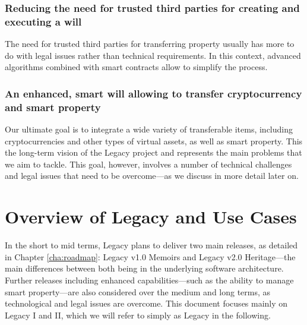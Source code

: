 \subsubsection*{Reducing the need for trusted third parties for creating and executing a will} %
\label{ssub:reducing_the_need_for_trusted_third_parties_for_creating_and_executing_a_will}
The need for trusted third parties for transferring property usually has more to do with legal issues rather than technical requirements. In this context, advanced algorithms combined with smart contracts allow to simplify the process.

\subsubsection*{An enhanced, smart will allowing to transfer cryptocurrency and smart property} %
\label{ssub:_an_enhanced_smart_will_allowing_to_transfer_cryptocurrency_and_smart_property_}
Our ultimate goal is to integrate a wide variety of transferable items, including cryptocurrencies and other types of virtual assets, as well as smart property. This the long-term vision of the Legacy project and represents the main problems that we aim to tackle. This goal, however, involves a number of technical challenges and legal issues that need to be overcome---as we discuss in more detail later on.


\section{Overview of Legacy and Use Cases} %
\label{sec:overview_of_legacy_and_use_cases}
In the short to mid terms, Legacy plans to deliver two main releases, as detailed in Chapter \ref{cha:roadmap}: Legacy v1.0 Memoirs and Legacy v2.0 Heritage---the main differences between both being in the underlying software architecture.  Further releases including enhanced capabilities---such as the ability to manage smart property---are also considered over the medium and long terms, as technological and legal issues are overcome. This document focuses mainly on Legacy I and II, which we will refer to simply as Legacy in the following. 

